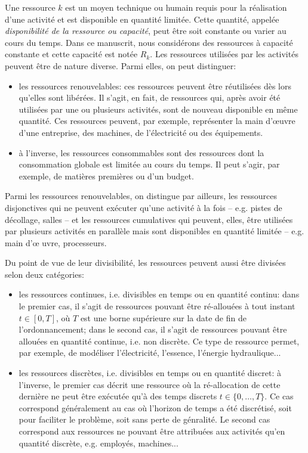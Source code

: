 Une ressource $k$ est un moyen technique ou humain requis pour la
réalisation d'une activité et est disponible en quantité
limitée. Cette quantité, appelée {\it disponibilité de la ressource ou
  capacité}, peut être soit constante ou varier au cours du
temps. Dans ce manuscrit, nous considérons des ressources à capacité
constante et cette capacité est notée $R_k$. Les ressources utilisées
par les activités peuvent être de nature diverse. Parmi elles, on peut
distinguer:
\begin{itemize}
\item les ressources renouvelables: ces ressources peuvent être
réutilisées dès lors qu'elles sont libérées. Il s'agit, en fait, de
ressources qui, après avoir été utilisées par une ou plusieurs
activités, sont de nouveau disponible en même quantité. Ces ressources
peuvent, par exemple, représenter la main d'\oe uvre d'une entreprise,
des machines, de l'électricité ou des équipements.
\item à l'inverse, les ressources consommables sont des ressources
dont la consommation globale est limitée au cours du temps. Il peut
s'agir, par exemple, de matières premières ou d'un budget.
\end{itemize}

Parmi les ressources renouvelables, on distingue par ailleurs, les
ressources disjonctives qui ne peuvent exécuter qu'une activité à la
fois -- e.g. pistes de décollage, salles -- et les ressources cumulatives
qui peuvent, elles,  être utilisées par plusieurs activités en
parallèle mais sont disponibles en quantité limitée -- e.g. main d'\oe
uvre,
processeurs.


Du point de vue de leur divisibilité, les ressources peuvent aussi
être divisées selon deux catégories: 
\begin{itemize}
\item les ressources continues, i.e. divisibles en temps ou en
  quantité continu: dans le premier cas, il s'agit de ressources
  pouvant être ré-allouées à tout instant $t \in [0,T]$, où $T$ est une
  borne supérieure sur la date de fin de l'ordonnancement; dans le
  second cas, il s'agit de ressources pouvant être allouées en quantité
  continue, i.e. non discrète. Ce type de ressource permet, par
  exemple, de modéliser l'électricité, l'essence, l'énergie hydraulique...
\item les ressources discrètes, i.e. divisibles en temps ou en quantité
  discret: à l'inverse, le premier cas décrit une ressource où la
  ré-allocation de cette dernière ne peut être 
  exécutée qu'à des temps discrets $t \in \{0,\dots,T\}$. Ce cas
  correspond généralement au cas où l'horizon de temps a été
  discrétisé, soit pour faciliter le problème, soit sans perte de
génralité. Le second cas correspond aux ressources ne pouvant être
attribuées aux activités qu'en quantité discrète, e.g. employés,
machines...
\end{itemize}

